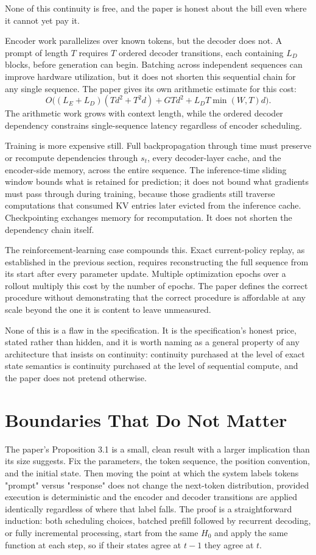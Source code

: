 \documentclass[11pt]{article}
\begin{document}
None of this continuity is free, and the paper is honest about the bill even where it cannot yet pay it.

Encoder work parallelizes over known tokens, but the decoder does not. A prompt of length $T$ requires $T$ ordered decoder transitions, each containing $L_D$ blocks, before generation can begin. Batching across independent sequences can improve hardware utilization, but it does not shorten this sequential chain for any single sequence. The paper gives its own arithmetic estimate for this cost:
\[
O\big((L_E + L_D)(Td^2 + T^2 d) + GTd^2 + L_D T \min(W,T) d\big).
\]
The arithmetic work grows with context length, while the ordered decoder dependency constrains single-sequence latency regardless of encoder scheduling.

Training is more expensive still. Full backpropagation through time must preserve or recompute dependencies through $s_t$, every decoder-layer cache, and the encoder-side memory, across the entire sequence. The inference-time sliding window bounds what is retained for prediction; it does not bound what gradients must pass through during training, because those gradients still traverse computations that consumed KV entries later evicted from the inference cache. Checkpointing exchanges memory for recomputation. It does not shorten the dependency chain itself.

The reinforcement-learning case compounds this. Exact current-policy replay, as established in the previous section, requires reconstructing the full sequence from its start after every parameter update. Multiple optimization epochs over a rollout multiply this cost by the number of epochs. The paper defines the correct procedure without demonstrating that the correct procedure is affordable at any scale beyond the one it is content to leave unmeasured.

None of this is a flaw in the specification. It is the specification's honest price, stated rather than hidden, and it is worth naming as a general property of any architecture that insists on continuity: continuity purchased at the level of exact state semantics is continuity purchased at the level of sequential compute, and the paper does not pretend otherwise.

\section{Boundaries That Do Not Matter}

The paper's Proposition 3.1 is a small, clean result with a larger implication than its size suggests. Fix the parameters, the token sequence, the position convention, and the initial state. Then moving the point at which the system labels tokens "prompt" versus "response" does not change the next-token distribution, provided execution is deterministic and the encoder and decoder transitions are applied identically regardless of where that label falls. The proof is a straightforward induction: both scheduling choices, batched prefill followed by recurrent decoding, or fully incremental processing, start from the same $H_0$ and apply the same function at each step, so if their states agree at $t-1$ they agree at $t$.
\end{document}
